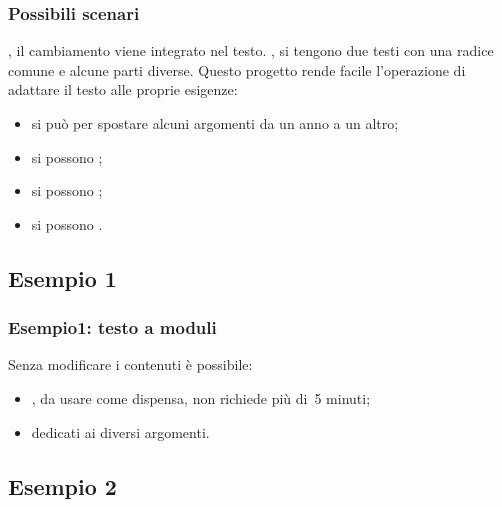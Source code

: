 \documentclass{beamer} %
\begin{document}
\begin{frame}\frametitle{Possibili scenari}

, 
il cambiamento viene integrato nel testo.
\spause
{}, 
si tengono due testi con una radice comune e alcune parti diverse.
\spause
Questo progetto rende facile l'operazione di adattare il testo alle proprie 
esigenze:
\begin{itemize} %
\item si può  
per spostare alcuni argomenti da un anno a un altro;
\item si possono ;
\item si possono ;
\item si possono .
\end{itemize}

\end{frame}


\subsection{Esempio 1}


\begin{frame}\frametitle{Esempio1: testo a moduli}

Senza modificare i contenuti è possibile:
\begin{itemize} 
\item {}, da usare come dispensa, 
non richiede più di~5 minuti;
\item {} dedicati 
ai diversi argomenti.
\end{itemize}

\end{frame}


\subsection{Esempio 2}
\end{document}
